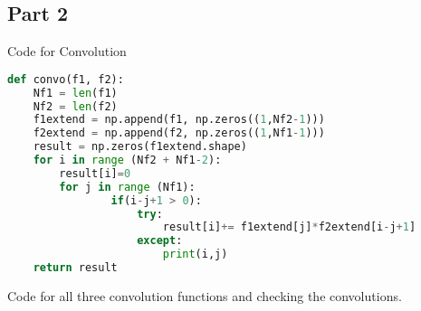 \documentclass[11pt,a4]{report}
\begin{document}
\subsection{Part 2}
Code for Convolution 
\begin{lstlisting}[language=Python]
def convo(f1, f2):
    Nf1 = len(f1)
    Nf2 = len(f2)
    f1extend = np.append(f1, np.zeros((1,Nf2-1)))
    f2extend = np.append(f2, np.zeros((1,Nf1-1)))
    result = np.zeros(f1extend.shape)
    for i in range (Nf2 + Nf1-2):
        result[i]=0
        for j in range (Nf1):
                if(i-j+1 > 0):
                    try:
                        result[i]+= f1extend[j]*f2extend[i-j+1]
                    except:
                        print(i,j)
    return result
\end{lstlisting}

Code for all three convolution functions and checking the convolutions. 
\end{document}

